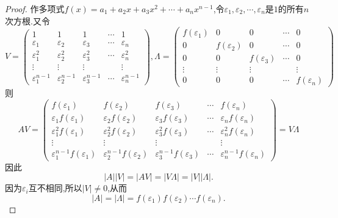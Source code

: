 \documentclass[lang=cn,newtx,10pt,scheme=chinese]{elegantbook}
\begin{document}
\begin{proof}
作多项式\(f(x)=a_1 + a_2x + a_3x^2+\cdots+a_nx^{n - 1}\),令\(\varepsilon_1,\varepsilon_2,\cdots,\varepsilon_n\)是\(1\)的所有\(n\)次方根.又令
\[
V = 
\begin{pmatrix}
1 & 1 & 1 & \cdots & 1\\
\varepsilon_1 & \varepsilon_2 & \varepsilon_3 & \cdots & \varepsilon_n\\
\varepsilon_1^2 & \varepsilon_2^2 & \varepsilon_3^2 & \cdots & \varepsilon_n^2\\
\vdots & \vdots & \vdots & & \vdots\\
\varepsilon_1^{n - 1} & \varepsilon_2^{n - 1} & \varepsilon_3^{n - 1} & \cdots & \varepsilon_n^{n - 1}
\end{pmatrix},
\Lambda = 
\begin{pmatrix}
f(\varepsilon_1) & 0 & 0 & \cdots & 0\\
0 & f(\varepsilon_2) & 0 & \cdots & 0\\
0 & 0 & f(\varepsilon_3) & \cdots & 0\\
\vdots & \vdots & \vdots & & \vdots\\
0 & 0 & 0 & \cdots & f(\varepsilon_n)
\end{pmatrix}
\]
则
\[
AV = 
\begin{pmatrix}
f(\varepsilon_1) & f(\varepsilon_2) & f(\varepsilon_3) & \cdots & f(\varepsilon_n)\\
\varepsilon_1f(\varepsilon_1) & \varepsilon_2f(\varepsilon_2) & \varepsilon_3f(\varepsilon_3) & \cdots & \varepsilon_nf(\varepsilon_n)\\
\varepsilon_1^2f(\varepsilon_1) & \varepsilon_2^2f(\varepsilon_2) & \varepsilon_3^2f(\varepsilon_3) & \cdots & \varepsilon_n^2f(\varepsilon_n)\\
\vdots & \vdots & \vdots & & \vdots\\
\varepsilon_1^{n - 1}f(\varepsilon_1) & \varepsilon_2^{n - 1}f(\varepsilon_2) & \varepsilon_3^{n - 1}f(\varepsilon_3) & \cdots & \varepsilon_n^{n - 1}f(\varepsilon_n)
\end{pmatrix}
= V\Lambda
\]
因此
\[
|A||V| = |AV| = |V\Lambda| = |V||\Lambda|.
\]
因为\(\varepsilon_i\)互不相同,所以\(|V|\neq0\),从而
\[
|A| = |\Lambda| = f(\varepsilon_1)f(\varepsilon_2)\cdots f(\varepsilon_n).
\]
\end{proof}
\end{document}
